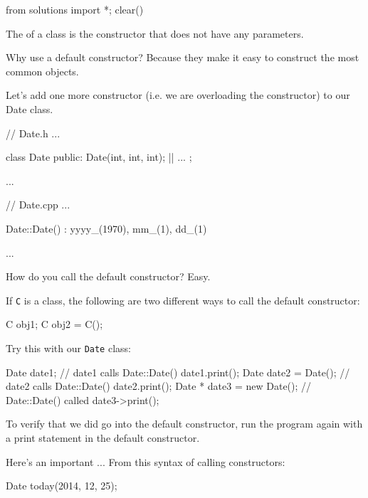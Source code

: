 \begin{python0}
from solutions import *; clear()
\end{python0}

The  of a class is the constructor that does
not have any parameters.

Why use a default constructor? Because they make it easy to construct
the most common objects.

Let's add one more constructor (i.e. we are overloading the constructor)
to our Date class.

\begin{consolethree}[escapeinside=||]
// Date.h
...

class Date
{
public:
    Date(int, int, int);
    ||
    ...
};

...
\end{consolethree}

\begin{consolethree}[escapeinside=||]
// Date.cpp
...

Date::Date()
    : yyyy_(1970), mm_(1), dd_(1)
{}

...
\end{consolethree}

How do you call the default constructor? Easy.

If \texttt{C} is a class, the following are two different ways to call the
default constructor:

\begin{consolethree}[escapeinside=||]
C obj1;
C obj2 = C();
\end{consolethree}

Try this with our \texttt{Date} class:

\begin{consolethree}[escapeinside=||]
Date date1;            // date1 calls Date::Date()
date1.print();
Date date2 = Date();   // date2 calls Date::Date()
date2.print();
Date * date3 = new Date(); // Date::Date() called
date3->print();
\end{consolethree}

To verify that we did go into the default constructor, run the program
again with a print statement in the default constructor.

Here's an important  ... From this
syntax of calling constructors:

\begin{consolethree}[escapeinside=||]
Date today(2014, 12, 25);
\end{consolethree}


